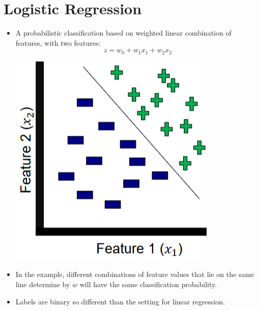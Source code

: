 \documentclass[10pt]{article}
\begin{document}
\section*{Logistic Regression}
\begin{itemize}
	\item A probabilistic classification based on weighted linear combination of features, with two features:
	\[z = w_0 + w_1 x_1 + w_2 x_2\]
    \begin{center} 
        \includegraphics*[scale=0.8]{W8_9.png} 
    \end{center}
    \item In the example, different combinations of feature values that lie on the same line determine by $w$ will have the same classification probability.
    \item Labels are binary so different than the setting for linear regression.
\end{itemize}
\end{document}
